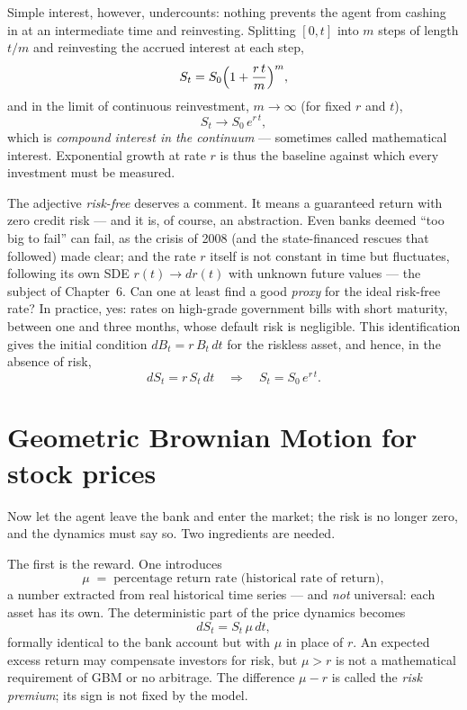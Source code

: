 Simple interest, however, undercounts: nothing prevents the agent from cashing in at an intermediate time and reinvesting.
Splitting $[0,t]$ into $m$ steps of length $t/m$ and reinvesting the accrued interest at each step,
\begin{equation}
S_t = S_0\Bigl(1 + \frac{r\,t}{m}\Bigr)^m,
\end{equation}
and in the limit of continuous reinvestment, $m\to\infty$ (for fixed $r$ and $t$),
\begin{equation}
S_t \longrightarrow S_0\, e^{r\,t},
\end{equation}
which is \emph{compound interest in the continuum} --- sometimes called mathematical interest.
Exponential growth at rate $r$ is thus the baseline against which every investment must be measured.

The adjective \emph{risk-free} deserves a comment.
It means a guaranteed return with zero credit risk --- and it is, of course, an abstraction.
Even banks deemed ``too big to fail'' can fail, as the crisis of 2008 (and the state-financed rescues that followed) made clear; and the rate $r$ itself is not constant in time but fluctuates, following its own SDE $r(t)\to dr(t)$ with unknown future values --- the subject of Chapter~6.
Can one at least find a good \emph{proxy} for the ideal risk-free rate?
In practice, yes: rates on high-grade government bills with short maturity, between one and three months, whose default risk is negligible.
This identification gives the initial condition $dB_t = r\, B_t\, dt$ for the riskless asset, and hence, in the absence of risk,
\begin{equation}
dS_t = r\, S_t\, dt \quad\Longrightarrow\quad S_t = S_0\, e^{r\,t}.
\end{equation}


\section{Geometric Brownian Motion for stock prices}\label{sec:gbm-stocks}

Now let the agent leave the bank and enter the market; the risk is no longer zero, and the dynamics must say so.
Two ingredients are needed.

The first is the reward.
One introduces
\begin{equation}
\mu \;=\; \text{percentage return rate (historical rate of return)},
\end{equation}
a number extracted from real historical time series --- and \emph{not} universal: each asset has its own.
The deterministic part of the price dynamics becomes
\begin{equation}
dS_t = S_t\,\mu\, dt,
\end{equation}
formally identical to the bank account but with $\mu$ in place of $r$.
An expected excess return may compensate investors for risk, but $\mu>r$ is not a mathematical requirement of GBM or no arbitrage.
The difference $\mu-r$ is called the \emph{risk premium}; its sign is not fixed by the model.

